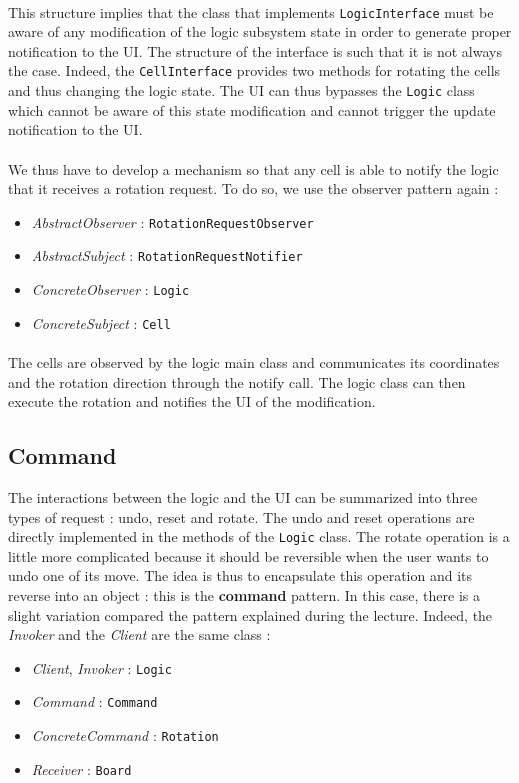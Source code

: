 \documentclass[a4paper,11pt]{article}
\begin{document}
\paragraph{}
 This structure implies that the class that implements \texttt{LogicInterface} must be aware of any modification of the logic subsystem state in order to generate proper notification to the UI. The structure of the interface is such that it is not always the case. Indeed, the \texttt{CellInterface} provides two methods for rotating the cells and thus changing the logic state. The UI can thus bypasses the \texttt{Logic} class which cannot be aware of this state modification and cannot trigger the update notification to the UI.
\\ \\ 
We thus have to develop a mechanism so that any cell is able to notify the logic that it receives a rotation request. To do so, we use the observer pattern again :\\
\begin{itemize}
	\item \textit{AbstractObserver} : \texttt{RotationRequestObserver}
	\item \textit{AbstractSubject} : \texttt{RotationRequestNotifier}
	\item \textit{ConcreteObserver} : \texttt{Logic}
	\item \textit{ConcreteSubject} : \texttt{Cell}
\end{itemize}
\paragraph{}
The cells are observed by the logic main class and communicates its coordinates and the rotation direction through the notify call. The logic class can then execute the rotation and notifies the UI of the modification.
\subsection{Command}
The interactions between the logic and the UI can be summarized into three types of request : undo, reset and rotate.  The undo and reset operations are directly implemented in the methods of the \texttt{Logic} class. The rotate operation is a little more complicated because it should be reversible when the user wants to undo one of its move. The idea is thus to encapsulate this operation and its reverse into an object : this is the \textbf{command} pattern. In this case, there is a slight variation compared the pattern explained during the lecture. Indeed, the \textit{Invoker} and the \textit{Client} are the same class : \\
\begin{itemize}
	\item \textit{Client}, \textit{Invoker} : \texttt{Logic}
	\item \textit{Command} : \texttt{Command}
	\item \textit{ConcreteCommand} : \texttt{Rotation}
	\item \textit{Receiver} : \texttt{Board}
\end{itemize}
\end{document}
